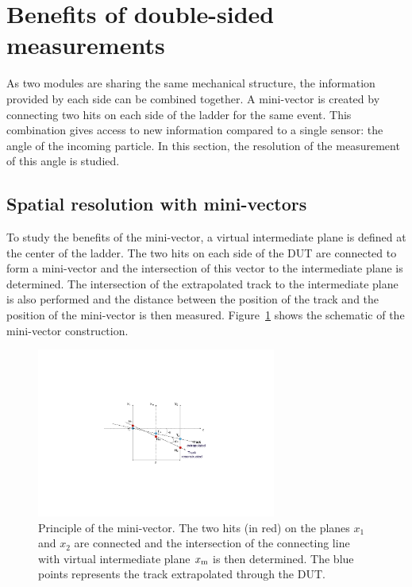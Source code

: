     
  \section{Benefits of double-sided measurements}
  
  As two modules are sharing the same mechanical structure, the information provided by each side can be combined together.
  A mini-vector is created by connecting two hits on each side of the ladder for the same event.
  This combination gives access to new information compared to a single sensor: the angle of the incoming particle.
  In this section, the resolution of the measurement of this angle is studied.

    \subsection{Spatial resolution with mini-vectors}

    To study the benefits of the mini-vector, a virtual intermediate plane is defined at the center of the ladder.
    The two hits on each side of the \gls{DUT} are connected to form a mini-vector and the intersection of this vector to the intermediate plane is determined.
    The intersection of the extrapolated track to the intermediate plane is also performed and the distance between the position of the track and the position of the mini-vector is then measured.
    Figure~\ref{fig:MV} shows the schematic of the mini-vector construction.

    \begin{figure}[!tbh]
      \centering
      \includegraphics[width=0.7\textwidth]{Pictures/deformation/mini_vectors.pdf}
      \caption{Principle of the mini-vector. The two hits (in red) on the planes $x_1$ and $x_2$ are connected and the intersection of the connecting line with virtual intermediate plane $x_{\rm{m}}$ is then determined. The blue points represents the track extrapolated through the DUT. }
      \label{fig:MV}
    \end{figure}

